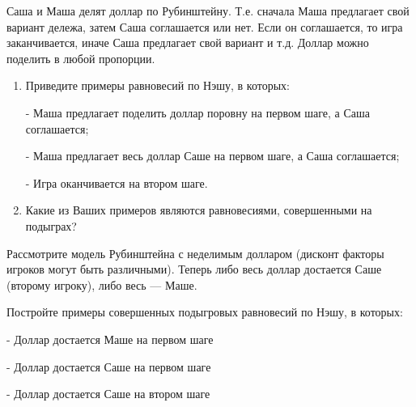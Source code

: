 \begin{problem}
Саша и Маша делят доллар по Рубинштейну. Т.е. сначала Маша предлагает свой вариант дележа, затем Саша соглашается или нет. Если он соглашается, то игра заканчивается,  иначе Саша предлагает свой вариант и т.д.
 Доллар можно поделить в любой пропорции.\par

\begin{enumerate}
\item  Приведите примеры равновесий по Нэшу, в которых:\par
- Маша предлагает поделить доллар поровну на первом шаге, а Саша соглашается;\par
- Маша предлагает весь доллар Саше на первом шаге, а Саша соглашается;\par
- Игра оканчивается на втором шаге.\par
\item Какие из Ваших примеров являются равновесиями, совершенными на подыграх?
\end{enumerate}


\begin{sol}

\end{sol}
\end{problem}



\begin{problem}\par
\begin{source} \cite[5.9.26]{binmore:fg} \end{source}
Рассмотрите модель Рубинштейна с неделимым долларом (дисконт факторы игроков могут быть различными). Теперь либо весь доллар достается Саше (второму игроку), либо весь — Маше.\par
 Постройте примеры совершенных подыгровых равновесий по Нэшу, в которых:\par
- Доллар достается Маше на первом шаге\par
- Доллар достается Саше на первом шаге\par
- Доллар достается Саше на втором шаге\par



\begin{sol}

\end{sol}
\end{problem}



